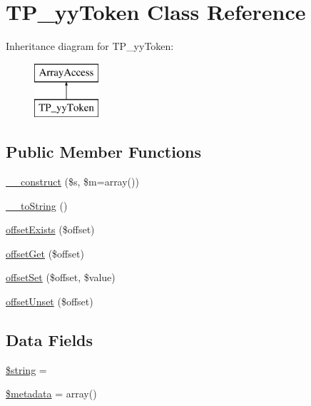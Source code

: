 \hypertarget{class_t_p__yy_token}{}\section{T\+P\+\_\+yy\+Token Class Reference}
\label{class_t_p__yy_token}
Inheritance diagram for T\+P\+\_\+yy\+Token\+:\begin{figure}[H]
\begin{center}
\leavevmode
\includegraphics[height=2.000000cm]{class_t_p__yy_token}
\end{center}
\end{figure}
\subsection*{Public Member Functions}
\begin{DoxyCompactItemize}
\item 
\hyperlink{class_t_p__yy_token_ad19e3b36f3e7325b04134c2c8907b139}{\+\_\+\+\_\+construct} (\$s, \$m=array())
\item 
\hyperlink{class_t_p__yy_token_a7516ca30af0db3cdbf9a7739b48ce91d}{\+\_\+\+\_\+to\+String} ()
\item 
\hyperlink{class_t_p__yy_token_a24ff257ec0c2221bc6fd7b1b4388e26e}{offset\+Exists} (\$offset)
\item 
\hyperlink{class_t_p__yy_token_a59aee6e89465b48f014699f41b521f87}{offset\+Get} (\$offset)
\item 
\hyperlink{class_t_p__yy_token_ac6bde6b1eb50eb5377e91771fe46b7a3}{offset\+Set} (\$offset, \$value)
\item 
\hyperlink{class_t_p__yy_token_a2411227ea7118b13495de9839fd4b563}{offset\+Unset} (\$offset)
\end{DoxyCompactItemize}
\subsection*{Data Fields}
\begin{DoxyCompactItemize}
\item 
\hyperlink{class_t_p__yy_token_a05bc82187ba145848edd864852f4bd37}{\$string} = \textquotesingle{}\textquotesingle{}
\item 
\hyperlink{class_t_p__yy_token_ae7fc3682b173ad9d4b1892bdc04d18d9}{\$metadata} = array()
\end{DoxyCompactItemize}


